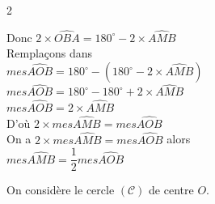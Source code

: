 \begin{multicols*}{2}
\begin{enumerate}
  		Donc $  2\times \widehat{OBA}=180^\circ -2\times \widehat{AMB} $ 
  		\\ Remplaçons  dans \\
  		$  mes \widehat{AOB}=180^\circ-(180^\circ -2\times \widehat{AMB} ) $\\
  		$  mes \widehat{AOB}=180^\circ-180^\circ +2\times \widehat{AMB}  $\\
  		$  mes \widehat{AOB}=2\times \widehat{AMB}  $\\ 
  		D'où $ 2 \times mes\widehat{AMB}=mes \widehat{AOB} $\\ On a 
  		$ 2 \times mes\widehat{AMB}=mes \widehat{AOB} $ alors \\ $ mes\widehat{AMB}=\dfrac{1}{2}mes\widehat{AOB}  $
  	\end{enumerate}
  	
  	On considère le cercle $\mathcal{(C)}$ de centre $O$.\\
  	\begin{minipage}{3cm}
  		

\end{minipage}
\end{multicols*}
